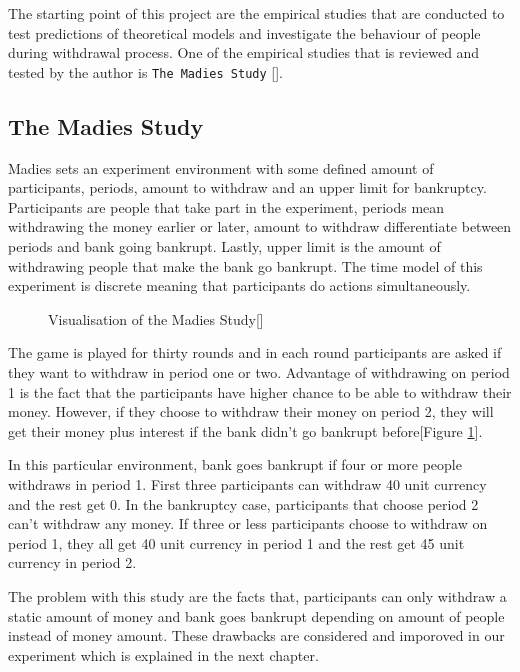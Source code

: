 The starting point of this project are the empirical studies that are conducted to test predictions of theoretical models and investigate the behaviour of people during withdrawal process. One of the empirical studies that is reviewed and tested by the author is  \verb|The Madies Study| [\cite{Madies2007}].

\subsection{The Madies Study}\label{sub:madies}

Madies sets an experiment environment with some defined amount of participants, periods, amount to withdraw and an upper limit for bankruptcy. Participants are  people that take part in the experiment, periods mean withdrawing the money earlier or later, amount to withdraw differentiate between periods and bank going bankrupt. Lastly, upper limit is the amount of withdrawing people that make the bank go bankrupt. The time model of this experiment is discrete meaning that participants do actions simultaneously.

\begin{figure}[h]
	\centerline{}
	\caption{Visualisation of the Madies Study[\cite{Madies2007}]}
	\label{tab:tabellenreferenz2}
	
\end{figure}


The game is played for thirty rounds and in each round participants are asked if they want to withdraw in period one or two. Advantage of withdrawing on period 1 is the fact that the participants have higher chance to be able to withdraw their money. However, if they choose to withdraw their money on period 2, they will get their money plus interest if the bank didn't go bankrupt before[Figure \ref{tab:tabellenreferenz2}].

In this particular environment, bank goes bankrupt if four or more people withdraws in period 1. First three participants can withdraw 40 unit currency and the rest get 0. In the bankruptcy case, participants that choose period 2 can't withdraw any money. If three or less participants choose to withdraw on period 1, they all get 40 unit currency in period 1 and the rest get 45 unit currency in period 2.

The problem with this study are the facts that, participants can only withdraw a static amount of money and bank goes bankrupt depending on amount of people instead of  money amount. These drawbacks are considered and imporoved in our experiment which is explained in the next chapter.


